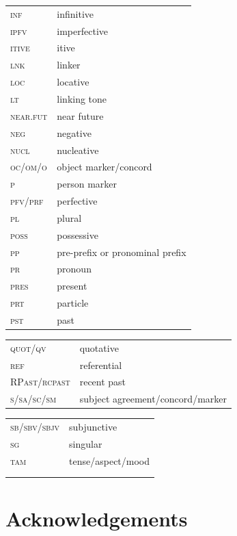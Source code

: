 \documentclass[output=paper,colorlinks,citecolor=brown,
]{langscibook}
\begin{document}
\begin{tabularx}{.45\textwidth}{lQ}
    \textsc{inf} &  infinitive\\
    \textsc{ipfv} &  imperfective\\
    \textsc{itive} &  itive\\
    \textsc{lnk} &  linker\\
    \textsc{loc} &  locative\\
    \textsc{lt} &  linking tone\\
    \textsc{near.fut} &  near future\\
    \textsc{neg} &  negative\\
    \textsc{nucl} &  nucleative\\
    \textsc{oc/om/o} &  object marker/concord\\
    \textsc{p} &  person marker\\
    \textsc{pfv/prf} &  perfective\\
    \textsc{pl} &  plural\\
    \textsc{poss} &  possessive\\
    \textsc{pp} &  pre-prefix or pronominal prefix\\
    \textsc{pr} &  pronoun\\
    \textsc{pres} &  present\\
    \textsc{prt} &  particle\\
    \textsc{pst} &  past\\
\end{tabularx}

\begin{tabularx}{.5\textwidth}{lQ}
    \textsc{quot/qv} &  quotative\\
    \textsc{ref} &  referential\\
    \textsc{RPast/rcpast} &  recent past\\
    \textsc{s/sa/sc/sm} &  subject agreement{\slash}concord{\slash}marker\\
    \end{tabularx}
\begin{tabularx}{.45\textwidth}{lQ}
    \textsc{sb/sbv/sbjv} &  subjunctive\\
    \textsc{sg} &  singular\\
    \textsc{tam} &  tense/aspect/mood\\
    \\
    \\
\end{tabularx}
\section*{Acknowledgements}
\end{document}
